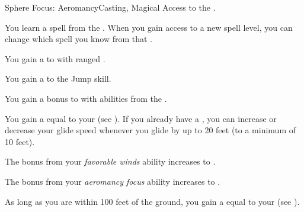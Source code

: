     \begin{feat}{Sphere Focus: Aeromancy}{Casting, Magical}
        \featpre Access to the  .

         You learn a spell from the  .
        When you gain access to a new spell level, you can change which spell you know from that .

         You gain a   to  with ranged .

         You gain a   to the Jump skill.

         You gain a  bonus to  with abilities from the  .

         You gain a  equal to your  (see ).
        If you already have a , you can increase or decrease your glide speed whenever you glide by up to 20 feet (to a minimum of 10 feet).

         The bonus from your \textit{favorable winds} ability increases to .

         The bonus from your \textit{aeromancy focus} ability increases to .

         As long as you are within 100 feet of the ground, you gain a  equal to your  (see ).
    \end{feat}

